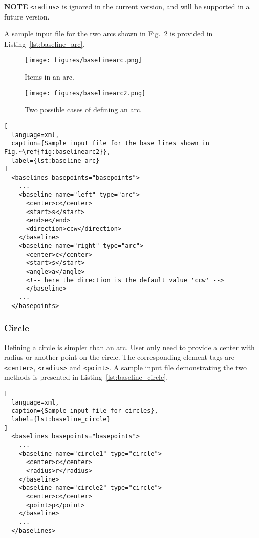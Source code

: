 \documentclass{book}
\begin{document}
\textbf{NOTE} \lstinline{<radius>} is ignored in the current version, 
and will be supported in a future version.

A sample input file for the two arcs shown in Fig.~\ref{fig:baselinearc2} 
is provided in Listing~\ref{lst:baseline_arc}.

\begin{figure}
  \centerline{\texttt{[image: figures/baselinearc.png]}}
  \caption{Items in an arc.}
  \label{fig:baselinearc}
\end{figure}

\begin{figure}
  \centerline{\texttt{[image: figures/baselinearc2.png]}}
  \caption{Two possible cases of defining an arc.}
  \label{fig:baselinearc2}
\end{figure}

\begin{lstlisting}[
  language=xml,
  caption={Sample input file for the base lines shown in Fig.~\ref{fig:baselinearc2}},
  label={lst:baseline_arc}
]
  <baselines basepoints="basepoints">
    ...
    <baseline name="left" type="arc">
      <center>c</center>
      <start>s</start>
      <end>e</end>
      <direction>ccw</direction>
    </baseline>
    <baseline name="right" type="arc">
      <center>c</center>
      <start>s</start>
      <angle>a</angle>
      <!-- here the direction is the default value 'ccw' -->
      </baseline>
    ...
  </basepoints>
\end{lstlisting}

\subsubsection{Circle}

Defining a circle is simpler than an arc. User only need to provide a 
center with radius or another point on the circle. The corresponding 
element tags are \lstinline{<center>}, \lstinline{<radius>} and 
\lstinline{<point>}. A sample input file demonstrating the two methods 
is presented in Listing~\ref{lst:baseline_circle}.

\begin{lstlisting}[
  language=xml,
  caption={Sample input file for circles},
  label={lst:baseline_circle}
]
  <baselines basepoints="basepoints">
    ...
    <baseline name="circle1" type="circle">
      <center>c</center>
      <radius>r</radius>
    </baseline>
    <baseline name="circle2" type="circle">
      <center>c</center>
      <point>p</point>
    </baseline>
    ...
  </baselines>
\end{lstlisting}
\end{document}
